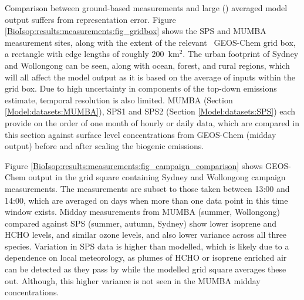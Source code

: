     Comparison between ground-based measurements and large (\lowhr) averaged model output suffers from representation error.
    Figure \ref{BioIsop:results:measurements:fig_gridbox} shows the SPS and MUMBA measurement sites, along with the extent of the relevant \lowhr ~GEOS-Chem grid box, a rectangle with edge lengths of roughly 200~km$^{2}$.
    The urban footprint of Sydney and Wollongong can be seen, along with ocean, forest, and rural regions, which will all affect the model output as it is based on the average of inputs within the grid box.
    Due to high uncertainty in components of the top-down emissions estimate, temporal resolution is also limited.
    MUMBA (Section \ref{Model:datasets:MUMBA}), SPS1 and SPS2 (Section \ref{Model:datasets:SPS}) each provide on the order of one month of hourly or daily data, which are compared in this section against surface level concentrations from GEOS-Chem (midday output) before and after scaling the biogenic emissions.
    
    
    
    Figure \ref{BioIsop:results:measurements:fig_campaign_comparison} shows GEOS-Chem output in the grid square containing Sydney and Wollongong campaign measurements.
    The measurements are subset to those taken between 13:00 and 14:00, which are averaged on days when more than one data point in this time window exists.
    Midday measurements from MUMBA (summer, Wollongong) compared against SPS (summer, autumn, Sydney) show lower isoprene and HCHO levels, and similar ozone levels, and also lower variance across all three species.
    Variation in SPS data is higher than modelled, which is likely due to a dependence on local meteorology, as plumes of HCHO or isoprene enriched air can be detected as they pass by while the modelled grid square averages these out.
    Although, this higher variance is not seen in the MUMBA midday concentrations.
    
    

